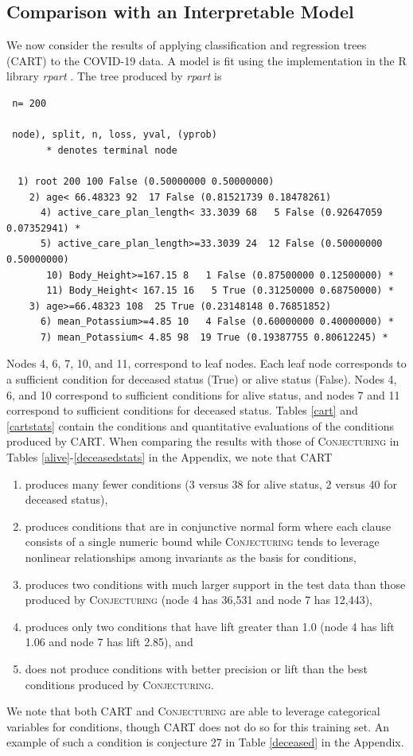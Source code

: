 \documentclass[ijds,nonblindrev]{informs-ijds}
\begin{document}
\subsection{Comparison with an Interpretable Model}
We now consider the results of applying classification and regression trees (CART)  \citep{breiman84} to the COVID-19 data.  A model is fit using the implementation in the R library {\it rpart} \citep{rpart}.  The tree produced by {\it rpart} is
\begin{verbatim}
 n= 200 
 
 node), split, n, loss, yval, (yprob)
       * denotes terminal node
 
  1) root 200 100 False (0.50000000 0.50000000)  
    2) age< 66.48323 92  17 False (0.81521739 0.18478261)  
      4) active_care_plan_length< 33.3039 68   5 False (0.92647059 0.07352941) *
      5) active_care_plan_length>=33.3039 24  12 False (0.50000000 0.50000000)  
       10) Body_Height>=167.15 8   1 False (0.87500000 0.12500000) *
       11) Body_Height< 167.15 16   5 True (0.31250000 0.68750000) *
    3) age>=66.48323 108  25 True (0.23148148 0.76851852)  
      6) mean_Potassium>=4.85 10   4 False (0.60000000 0.40000000) *
      7) mean_Potassium< 4.85 98  19 True (0.19387755 0.80612245) *
\end{verbatim}

Nodes 4, 6, 7, 10, and 11, correspond to leaf nodes.  Each leaf node corresponds to a sufficient condition for deceased status (True) or alive status (False).  Nodes 4, 6, and 10 correspond to sufficient conditions for alive status, and nodes 7 and 11 correspond to sufficient conditions for deceased status.  Tables \ref{cart} and  \ref{cartstats} contain the conditions and quantitative evaluations of the conditions produced by CART.  When comparing the results with those of \textsc{Conjecturing} in Tables \ref{alive}-\ref{deceasedstats} in the Appendix, we note that CART 
\begin{enumerate}
    \item produces many fewer conditions (3 versus 38 for alive status, 2 versus 40 for deceased status), 
    \item produces conditions that are in conjunctive normal form where each clause consists of a single numeric bound while \textsc{Conjecturing} tends to leverage nonlinear relationships among invariants as the basis for conditions, 
    \item produces two conditions with much larger support in the test data than those produced by \textsc{Conjecturing} (node 4 has 36,531 and node 7 has 12,443),  
    \item produces only two conditions that have lift greater than 1.0 (node 4 has lift 1.06 and node 7 has lift 2.85), and 
    \item does not produce conditions with better precision or lift than the best conditions produced by \textsc{Conjecturing}.  
\end{enumerate}
We note that both CART and \textsc{Conjecturing} are able to leverage categorical variables for conditions, though CART does not do so for this training set.  An example of such a condition is conjecture 27 in Table \ref{deceased} in the Appendix.   
\end{document}

